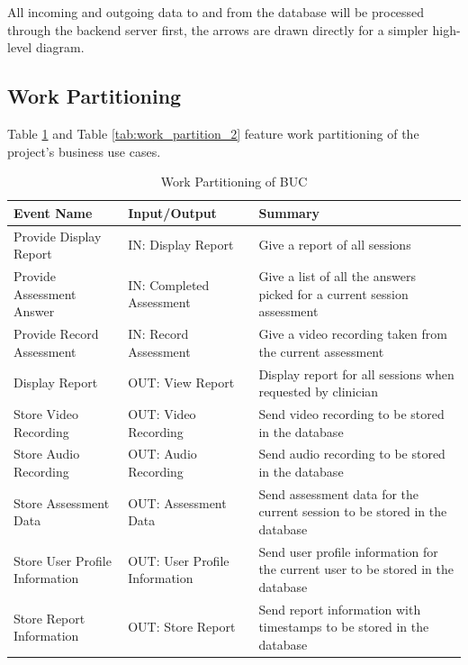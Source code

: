 \documentclass[12pt]{article}
\begin{document}
All incoming and outgoing data to and from the database will be processed through the backend server first, the arrows are drawn directly for a simpler high-level diagram. 
\subsection{Work Partitioning}
\hspace{2em}Table \ref{tab:work_partition_1} and Table \ref{tab:work_partition_2} feature work partitioning of the project's business use cases.
\begin{table}[H]
  \centering
  \caption{Work Partitioning of BUC}
  \label{tab:work_partition_1}
  \begin{tabularx}{1.2\textwidth} { 
     | >{\raggedright\arraybackslash}X 
     | >{\raggedright\arraybackslash}X 
     | >{\raggedright\arraybackslash}X | }
  \hline
  \textbf{Event Name} & \textbf{Input/Output} & \textbf{Summary} \\
  \hline
  Provide Display Report & IN: Display Report & Give a report of all sessions\\ 
  \hline
  Provide Assessment Answer & IN: Completed Assessment & Give a list of all the answers picked for a current session assessment \\ 
  \hline
  Provide Record Assessment & IN: Record Assessment & Give a video recording taken from the current assessment \\ 
  \hline
  Display Report & OUT: View Report  & Display report for all sessions when requested by clinician   \\ 
  \hline
  Store Video Recording & OUT: Video Recording  & Send video recording to be stored in the database \\
  \hline
  Store Audio Recording & OUT: Audio Recording  & Send audio recording to be stored in the database \\
  \hline
  Store Assessment Data & OUT: Assessment Data  & Send assessment data for the current session to be stored in the database \\
  \hline
  Store User Profile Information & OUT: User Profile Information  & Send user profile information for the current user to be stored in the database \\
  \hline
  Store Report Information & OUT: Store Report  & Send report information with timestamps to be stored in the database \\
  \hline
  \end{tabularx}
\end{table}
\end{document}
